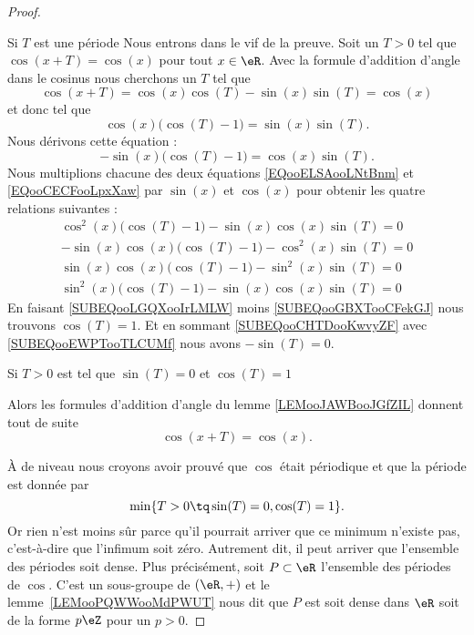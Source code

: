 \begin{proof}
\begin{subproof}
		\item[Si \( T\) est une période]
		Nous entrons dans le vif de la preuve. Soit un \( T>0\) tel que \( \cos(x+T)=\cos(x)\) pour tout \( x\in \eR\). Avec la formule d'addition d'angle dans le cosinus nous cherchons un \( T\) tel que
		\begin{equation}
			\cos(x+T)=\cos(x)\cos(T)-\sin(x)\sin(T)=\cos(x)
		\end{equation}
		et donc tel que
		\begin{equation}        \label{EQooELSAooLNtBnm}
			\cos(x)\big( \cos(T)-1 \big)=\sin(x)\sin(T).
		\end{equation}
		Nous dérivons cette équation :
		\begin{equation}        \label{EQooCECFooLpxXaw}
			-\sin(x)\big( \cos(T)-1 \big)=\cos(x)\sin(T).
		\end{equation}
		Nous multiplions chacune des deux équations \eqref{EQooELSAooLNtBnm} et \eqref{EQooCECFooLpxXaw} par \( \sin(x)\) et \( \cos(x)\) pour obtenir les quatre relations suivantes :
		\begin{subequations}
			\begin{align}
				\cos^2(x)\big( \cos(T)-1 \big)-\sin(x)\cos(x)\sin(T)=0   \label{SUBEQooLGQXooIrLMLW}    \\
				-\sin(x)\cos(x)\big( \cos(T)-1 \big)-\cos^2(x)\sin(T)=0     \label{SUBEQooCHTDooKwvyZF} \\
				\sin(x)\cos(x)\big( \cos(T)-1 \big)-\sin^2(x)\sin(T)=0 \label{SUBEQooEWPTooTLCUMf}      \\
				\sin^2(x)\big( \cos(T)-1 \big)-\sin(x)\cos(x)\sin(T)=0  \label{SUBEQooGBXTooCFekGJ}
			\end{align}
		\end{subequations}
		En faisant \eqref{SUBEQooLGQXooIrLMLW} moins \eqref{SUBEQooGBXTooCFekGJ} nous trouvons \( \cos(T)=1\). Et en sommant \eqref{SUBEQooCHTDooKwvyZF} avec \eqref{SUBEQooEWPTooTLCUMf} nous avons \( -\sin(T)=0\).

		\item[Si \( T>0\) est tel que \( \sin(T)=0\) et \( \cos(T)=1\)]

		Alors les formules d'addition d'angle du lemme \ref{LEMooJAWBooJGfZIL} donnent tout de suite
		\begin{equation}
			\cos(x+T)=\cos(x).
		\end{equation}

	\end{subproof}

	À de niveau nous croyons avoir prouvé que \( \cos\) était périodique et que la période est donnée par
	\begin{equation}
		\min\{ T>0\tq \sin(T)=0,\cos(T)=1 \}.
	\end{equation}
	Or rien n'est moins sûr parce qu'il pourrait arriver que ce minimum n'existe pas, c'est-à-dire que l'infimum soit zéro. Autrement dit, il peut arriver que l'ensemble des périodes soit dense. Plus précisément, soit \( P\subset \eR\) l'ensemble des périodes de \( \cos\). C'est un sous-groupe de \( (\eR,+)\) et le lemme~\ref{LEMooPQWWooMdPWUT} nous dit que \( P\) est soit dense dans \( \eR\) soit de la forme \( p\eZ\) pour un \( p>0\).


\end{proof}
